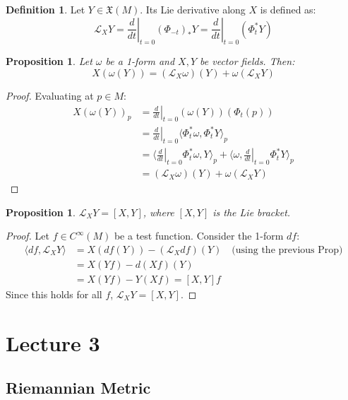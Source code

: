 \documentclass[11pt, a4paper]{article}
\theoremstyle{plain}
\newtheorem{proposition}[theorem]{Proposition}
\theoremstyle{definition}
\newtheorem{definition}[theorem]{Definition}
\theoremstyle{remark}
\begin{document}
\begin{definition}
Let $Y \in \mathfrak{X}(M)$. Its Lie derivative along $X$ is defined as:
\[
\mathcal{L}_X Y = \left. \frac{d}{dt} \right|_{t=0} (\Phi_{-t})_* Y = \left. \frac{d}{dt} \right|_{t=0} (\Phi_t^* Y)
\]
\end{definition}

\begin{proposition}
Let $\omega$ be a 1-form and $X, Y$ be vector fields. Then:
\[
X(\omega(Y)) = (\mathcal{L}_X \omega)(Y) + \omega(\mathcal{L}_X Y)
\]
\end{proposition}
\begin{proof}
Evaluating at $p \in M$:
\begin{align*}
X(\omega(Y))_p &= \left. \frac{d}{dt} \right|_{t=0} (\omega(Y))(\Phi_t(p)) \\
&= \left. \frac{d}{dt} \right|_{t=0} \langle \Phi_t^* \omega, \Phi_t^* Y \rangle_p \\
&= \langle \left. \frac{d}{dt} \right|_{t=0} \Phi_t^* \omega, Y \rangle_p + \langle \omega, \left. \frac{d}{dt} \right|_{t=0} \Phi_t^* Y \rangle_p \\
&= (\mathcal{L}_X \omega)(Y) + \omega(\mathcal{L}_X Y)
\end{align*}
\end{proof}

\begin{proposition}
$\mathcal{L}_X Y = [X, Y]$, where $[X, Y]$ is the Lie bracket.
\end{proposition}
\begin{proof}
Let $f \in C^\infty(M)$ be a test function. Consider the 1-form $df$:
\begin{align*}
\langle df, \mathcal{L}_X Y \rangle &= X(df(Y)) - (\mathcal{L}_X df)(Y) \quad \text{(using the previous Prop)} \\
&= X(Yf) - d(Xf)(Y) \\
&= X(Yf) - Y(Xf) = [X, Y]f
\end{align*}
Since this holds for all $f$, $\mathcal{L}_X Y = [X, Y]$.
\end{proof}
\newpage
\section{Lecture 3}

\subsection{Riemannian Metric}
\end{document}
